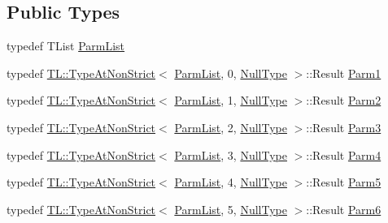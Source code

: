 \subsection*{Public Types}
\begin{DoxyCompactItemize}
\item 
typedef T\+List \mbox{\hyperlink{classUtil_1_1FunctionMap_a6cf0e6766cf6f20642ba61c4994bb477}{Parm\+List}}
\item 
typedef \mbox{\hyperlink{structUtil_1_1TL_1_1TypeAtNonStrict}{T\+L\+::\+Type\+At\+Non\+Strict}}$<$ \mbox{\hyperlink{classUtil_1_1FunctionMap_a6cf0e6766cf6f20642ba61c4994bb477}{Parm\+List}}, 0, \mbox{\hyperlink{classUtil_1_1NullType}{Null\+Type}} $>$\+::Result \mbox{\hyperlink{classUtil_1_1FunctionMap_a7b842c0101fae8075e8b21c90ede63cb}{Parm1}}
\item 
typedef \mbox{\hyperlink{structUtil_1_1TL_1_1TypeAtNonStrict}{T\+L\+::\+Type\+At\+Non\+Strict}}$<$ \mbox{\hyperlink{classUtil_1_1FunctionMap_a6cf0e6766cf6f20642ba61c4994bb477}{Parm\+List}}, 1, \mbox{\hyperlink{classUtil_1_1NullType}{Null\+Type}} $>$\+::Result \mbox{\hyperlink{classUtil_1_1FunctionMap_a46a76423783c6a8dcc4442ffb8cf54a4}{Parm2}}
\item 
typedef \mbox{\hyperlink{structUtil_1_1TL_1_1TypeAtNonStrict}{T\+L\+::\+Type\+At\+Non\+Strict}}$<$ \mbox{\hyperlink{classUtil_1_1FunctionMap_a6cf0e6766cf6f20642ba61c4994bb477}{Parm\+List}}, 2, \mbox{\hyperlink{classUtil_1_1NullType}{Null\+Type}} $>$\+::Result \mbox{\hyperlink{classUtil_1_1FunctionMap_a4578d42cd0723beba85654aa774d0145}{Parm3}}
\item 
typedef \mbox{\hyperlink{structUtil_1_1TL_1_1TypeAtNonStrict}{T\+L\+::\+Type\+At\+Non\+Strict}}$<$ \mbox{\hyperlink{classUtil_1_1FunctionMap_a6cf0e6766cf6f20642ba61c4994bb477}{Parm\+List}}, 3, \mbox{\hyperlink{classUtil_1_1NullType}{Null\+Type}} $>$\+::Result \mbox{\hyperlink{classUtil_1_1FunctionMap_a912703c1f39a6e219b2449183e48fb07}{Parm4}}
\item 
typedef \mbox{\hyperlink{structUtil_1_1TL_1_1TypeAtNonStrict}{T\+L\+::\+Type\+At\+Non\+Strict}}$<$ \mbox{\hyperlink{classUtil_1_1FunctionMap_a6cf0e6766cf6f20642ba61c4994bb477}{Parm\+List}}, 4, \mbox{\hyperlink{classUtil_1_1NullType}{Null\+Type}} $>$\+::Result \mbox{\hyperlink{classUtil_1_1FunctionMap_a993589d5b721f73c7905377e24dbf9f4}{Parm5}}
\item 
typedef \mbox{\hyperlink{structUtil_1_1TL_1_1TypeAtNonStrict}{T\+L\+::\+Type\+At\+Non\+Strict}}$<$ \mbox{\hyperlink{classUtil_1_1FunctionMap_a6cf0e6766cf6f20642ba61c4994bb477}{Parm\+List}}, 5, \mbox{\hyperlink{classUtil_1_1NullType}{Null\+Type}} $>$\+::Result \mbox{\hyperlink{classUtil_1_1FunctionMap_ae121f4a5c3534a888db59d6702a15b40}{Parm6}}

\end{DoxyCompactItemize}
